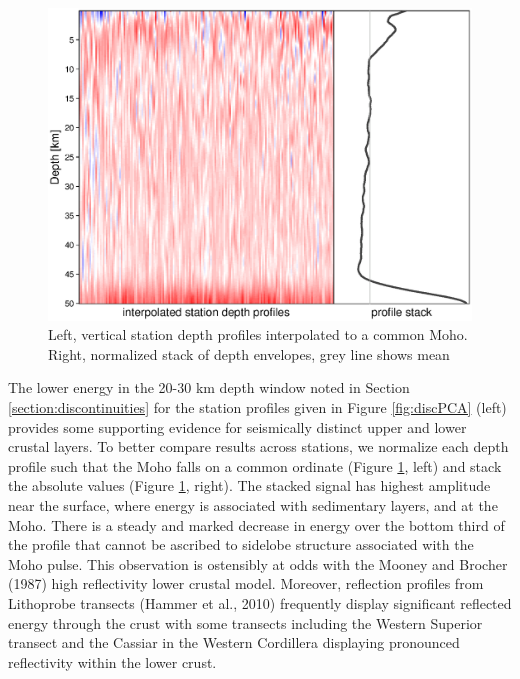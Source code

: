 \documentclass[msc,oneside]{ubcthesis}
\begin{document}
\begin{figure}
 \centering
 \includegraphics[width=\textwidth]{discInterp.eps}
 \caption[Normalized station depth profiles and SVD analysis]{Left, vertical station depth profiles interpolated to a common Moho. Right, normalized stack of depth envelopes, grey line shows mean}
 \label{fig:discInterp}
\end{figure}

The lower energy in the 20-30 km depth window noted in Section \ref{section:discontinuities} for the station profiles given in Figure \ref{fig:discPCA} (left) provides some supporting evidence for seismically distinct upper and lower crustal layers. To better compare results across stations, we normalize each depth profile such that the Moho falls on a common ordinate (Figure \ref{fig:discInterp}, left) and stack the absolute values (Figure \ref{fig:discInterp}, right). The stacked signal has highest amplitude near the surface, where energy is associated with sedimentary layers, and at the Moho. There is a steady and marked decrease in energy over the bottom third of the profile that cannot be ascribed to sidelobe structure associated with the Moho pulse. This observation is ostensibly at odds with the Mooney and Brocher (1987) high reflectivity lower crustal model. Moreover, reflection profiles from {\sc Lithoprobe} transects (Hammer et al., 2010) frequently display significant reflected energy through the crust with some transects including the Western Superior transect and the Cassiar in the Western Cordillera displaying pronounced reflectivity within the lower crust.
\end{document}
